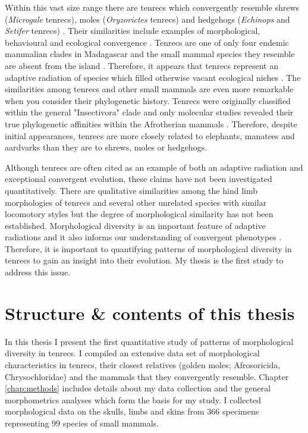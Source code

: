 	Within this vast size range there are tenrecs which convergently resemble shrews (\textit{Microgale} tenrecs), moles (\textit{Oryzorictes} tenrecs) and hedgehogs (\textit{Echinops} and \textit{Setifer} tenrecs) \citep{Eisenberg1969}. Their similarities include examples of morphological, behavioural and ecological convergence \citep{Soarimalala2011}. Tenrecs are one of only four endemic mammalian clades in Madagascar and the small mammal species they resemble are absent from the island \citep{Garbutt1999}. Therefore, it appears that tenrecs represent an adaptive radiation of species which filled otherwise vacant ecological niches \citep{Soarimalala2011}.
	The similarities among tenrecs and other small mammals are even more remarkable when you consider their phylogenetic history. Tenrecs were originally classified within the general "Insectivora" clade and only molecular studies revealed their true phylogenetic affinities within the Afrotherian mammals \citep{Stanhope1998}. Therefore, despite initial appearances, tenrecs are more closely related to elephants, manatees and aardvarks than they are to shrews, moles or hedgehogs. 

	Although tenrecs are often cited as an example of both an adaptive radiation and exceptional convergent evolution, these claims have not been investigated quantitatively. There are qualitative similarities among the hind limb morphologies of tenrecs and several other unrelated species with similar locomotory styles \citep{Salton2009} but the degree of morphological similarity has not been established. Morphological diversity is an important feature of adaptive radiations \citep{Losos2010a} and it also informs our understanding of convergent phenotypes \citep{Muschick2012}. Therefore, it is important to quantifying patterns of morphological diversity in tenrecs to gain an insight into their evolution. My thesis is the first study to address this issue. 

\section{Structure \& contents of this thesis}
	
	In this thesis I present the first quantitative study of patterns of morphological diversity in tenrecs. I compiled an extensive data set of morphological characteristics in tenrecs, their closest relatives (golden moles; Afrosoricida, Chrysochloridae) and the mammals that they convergently resemble. Chapter \ref{chap:methods} includes details about my data collection and the general morphometrics analyses which form the basis for my study. I collected morphological data on the skulls, limbs and skins from 366 specimens representing 99 species of small mammals. 
	
